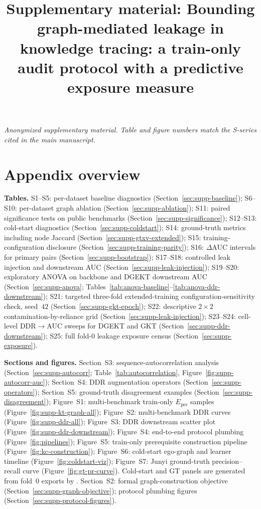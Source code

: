 \documentclass[preprint,11pt]{elsarticle}
\newcommand{\Epre}{\ensuremath{E_{\text{pre}}}}
\newcommand{\DDR}{\textsc{DDR}}
\begin{document}
\begin{frontmatter}
\title{Supplementary material: Bounding graph-mediated leakage in
knowledge tracing: a train-only audit protocol with a predictive
exposure measure}
\end{frontmatter}

\noindent\textit{Anonymized supplementary material. Table and figure
numbers match the S-series cited in the main manuscript.}

\appendix
\section*{Appendix overview}
\label{sec:supp-overview}
\noindent\textbf{Tables.}
S1--S5: per-dataset baseline diagnostics (Section~\ref{sec:supp-baseline});
S6--S10: per-dataset graph ablation (Section~\ref{sec:supp-ablation});
S11: paired significance tests on public benchmarks
(Section~\ref{sec:supp-significance});
S12--S13: cold-start diagnostics (Section~\ref{sec:supp-coldstart});
S14: ground-truth metrics including node Jaccard
(Section~\ref{sec:supp-gtxv-extended});
S15: training-configuration disclosure (Section~\ref{sec:supp-training-parity});
S16: $\Delta$AUC intervals for primary pairs (Section~\ref{sec:supp-bootstrap});
S17--S18: controlled leak injection and downstream AUC
(Section~\ref{sec:supp-leak-injection});
S19--S20: exploratory ANOVA on backbone and DGEKT downstream AUC
(Section~\ref{sec:supp-anova}; Tables~\ref{tab:anova-baseline}--\ref{tab:anova-ddr-downstream});
S21: targeted three-fold extended-training configuration-sensitivity check,
seed~$42$ (Section~\ref{sec:supp-gkt-epoch});
S22: descriptive $2{\times}2$ contamination-by-reliance grid
(Section~\ref{sec:supp-leak-injection});
S23--S24: cell-level \DDR{}$\to$AUC sweeps for DGEKT and GKT
(Section~\ref{sec:supp-ddr-downstream});
S25: full fold-0 leakage exposure census
(Section~\ref{sec:supp-exposure}).

\medskip\noindent\textbf{Sections and figures.}
Section~S3: sequence-autocorrelation analysis
(Section~\ref{sec:supp-autocorr}; Table~\ref{tab:autocorrelation},
Figure~\ref{fig:supp-autocorr-auc});
Section~S4: \DDR{} augmentation operators (Section~\ref{sec:supp-operators});
Section~S5: ground-truth disagreement examples
(Section~\ref{sec:supp-disagreement});
Figure~S1: multi-benchmark train-only $\Epre$ samples
(Figure~\ref{fig:supp-kt-graph-all});
Figure~S2: multi-benchmark \DDR{} curves (Figure~\ref{fig:supp-ddr-all});
Figure~S3: \DDR{} downstream scatter plot
(Figure~\ref{fig:supp-ddr-downstream});
Figure~S4: end-to-end protocol plumbing (Figure~\ref{fig:pipelines});
Figure~S5: train-only prerequisite construction pipeline
(Figure~\ref{fig:kc-construction});
Figure~S6: cold-start ego-graph and learner timeline
(Figure~\ref{fig:coldstart-viz});
Figure~S7: Junyi ground-truth precision--recall curve
(Figure~\ref{fig:gt-pr-curve}).
Cold-start and GT panels are generated from fold~0 exports by
.
Section~S2: formal graph-construction objective (Section~\ref{sec:supp-graph-objective});
protocol plumbing figures (Section~\ref{sec:supp-protocol-figures}).
\end{document}
